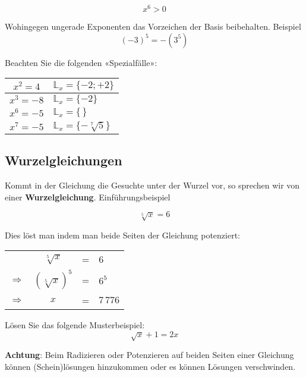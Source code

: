 $$x^6 > 0$$

Wohingegen ungerade Exponenten das Vorzeichen der Basis
beibehalten. Beispiel
$$(-3)^5 = - (3^5)$$

Beachten Sie die folgenden «Spezialfälle»:

\begin{tabular}{|c|l|}
  \hline
  $x^2 = 4$& $\mathbb{L}_x=\{-2; +2\}$ \\
  \hline
  $x^3 = -8$& $\mathbb{L}_x=\{-2\}$ \\
  \hline
  $x^6 = -5$& $\mathbb{L}_x=\{\,\}$ \\
  \hline
  $x^7 = -5$& $\mathbb{L}_x=\{-\sqrt[7]{5}\}$ \\
  \hline
  \end{tabular} 

\newpage
\subsection{Wurzelgleichungen}
Kommt in der Gleichung die Gesuchte unter der Wurzel vor, so sprechen
wir von einer \textbf{Wurzelgleichung}. Einführungsbeispiel


$$\sqrt[5]{x}=6$$


Dies löst man indem man beide Seiten der Gleichung potenziert:

\begin{tabular}{rccl}
  \             & $\sqrt[5]{x}$   &=&     6      \\
  $\Rightarrow$ & $(\sqrt[5]x)^5$ &=&  $6^5$     \\
  $\Rightarrow$ & $x$             &=& $7\,776$ 
\end{tabular}


Lösen Sie das folgende Musterbeispiel:
$$\sqrt{x}+1=2x$$



\textbf{Achtung}: Beim Radizieren oder Potenzieren auf beiden Seiten
einer Gleichung können (Schein)lösungen hinzukommen  oder es können Lösungen verschwinden.
\newpage



